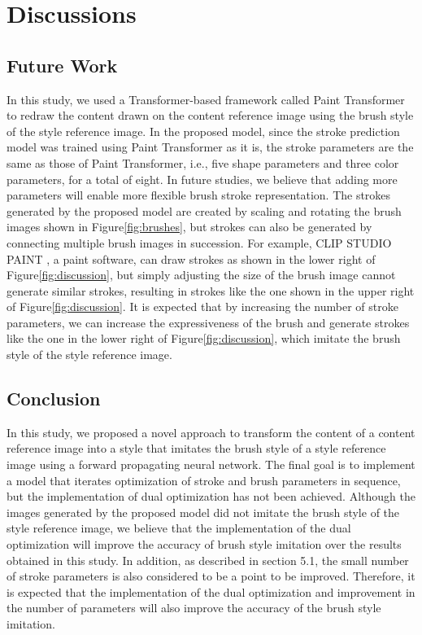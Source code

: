 \documentclass{mva_style}
\begin{document}
\section{Discussions}
\subsection{Future Work}
In this study, we used a Transformer-based framework called Paint Transformer 
to redraw the content drawn on the content reference image using the brush 
style of the style reference image. In the proposed model, since the stroke 
prediction model was trained using Paint Transformer as it is, the stroke 
parameters are the same as those of Paint Transformer, i.e., five shape 
parameters and three color parameters, for a total of eight. In future studies, 
we believe that adding more parameters will enable more flexible brush stroke 
representation. The strokes generated by the proposed model are created by 
scaling and rotating the brush images shown in Figure\ref{fig:brushes}, but 
strokes can also be generated by connecting multiple brush images in 
succession. For example, CLIP STUDIO PAINT \cite{ClipStudio}, a paint software, 
can draw strokes as shown in the lower right of Figure\ref{fig:discussion}, but simply 
adjusting the size of the brush image cannot generate similar strokes, 
resulting in strokes like the one shown in the upper right of Figure\ref{fig:discussion}.
It is expected that by increasing the number of stroke parameters, we can 
increase the expressiveness of the brush and generate strokes like the one 
in the lower right of Figure\ref{fig:discussion}, which imitate the brush style of the 
style reference image. 

\subsection{Conclusion}
In this study, we proposed a novel approach to transform the content of a 
content reference image into a style that imitates the brush style of a style 
reference image using a forward propagating neural network. The final goal 
is to implement a model that iterates optimization of stroke and brush 
parameters in sequence, but the implementation of dual optimization has not 
been achieved. Although the images generated by the proposed model did not 
imitate the brush style of the style reference image, we believe that the 
implementation of the dual optimization will improve the accuracy of brush 
style imitation over the results obtained in this study.
In addition, as described in section 5.1, the small number of stroke parameters 
is also considered to be a point to be improved. Therefore, it is expected 
that the implementation of the dual optimization and improvement in the number 
of parameters will also improve the accuracy of the brush style imitation.
\end{document}
